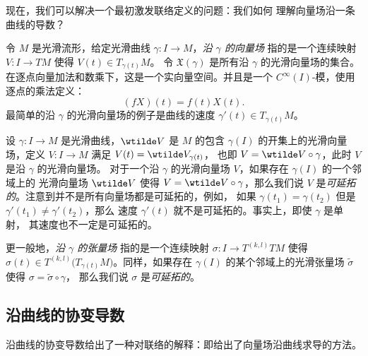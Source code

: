 \documentclass[fontset=none]{Notes}
\begin{document}
现在，我们可以解决一个最初激发联络定义的问题：我们如何
理解向量场沿一条曲线的导数？

令 $M$ 是光滑流形，给定光滑曲线 $\gamma:I\to M$，\emph{沿 $\gamma$ 的向量场}
指的是一个连续映射 $V:I\to TM$ 使得 $V(t)\in T_{\gamma(t)}M$。
令 $\mathfrak{X}(\gamma)$ 是所有沿 $\gamma$ 的光滑向量场的集合。
在逐点向量加法和数乘下，这是一个实向量空间。并且是一个
$C^\infty(I)$-模，使用逐点的乘法定义：
\[
  (fX)(t)=f(t)X(t).  
\]
最简单的沿 $\gamma$ 的光滑向量场的例子是曲线的速度
$\gamma'(t)\in T_{\gamma(t)}M$。

设 $\gamma:I\to M$ 是光滑曲线，$\wtilde V$ 是 $M$ 的包含 $\gamma(I)$
的开集上的光滑向量场，定义 $V:I\to M$ 满足 $V(t)= \wtilde V_{\gamma(t)}$，
也即 $V=\wtilde V\circ \gamma$，此时 $V$ 是沿 $\gamma$ 的光滑向量场。
对于一个沿 $\gamma$ 的光滑向量场 $V$，如果存在 $\gamma(I)$ 的一个邻域上的
光滑向量场 $\wtilde V$ 使得 $V=\wtilde V\circ\gamma$，那么我们说
$V$ 是\emph{可延拓的}。注意到并不是所有向量场都是可延拓的，例如，
如果 $\gamma(t_1)=\gamma(t_2)$ 但是 $\gamma'(t_1)\neq \gamma'(t_2)$，那么
速度 $\gamma'(t)$ 就不是可延拓的。事实上，即使 $\gamma$ 是单射，
其速度也不一定是可延拓的。

更一般地，\emph{沿 $\gamma$ 的张量场} 指的是一个连续映射 $\sigma:I\to T^{(k,l)}TM$
使得 $\sigma(t)\in T^{(k,l)}\bigl(T_{\gamma(t)}M\bigr)$。同样，如果存在
$\gamma(I)$ 的某个邻域上的光滑张量场 $\tilde\sigma$ 使得 $\sigma=\tilde\sigma\circ\gamma$，
那么我们说 $\sigma$ 是\emph{可延拓的}。

\subsection{沿曲线的协变导数}

沿曲线的协变导数给出了一种对联络的解释：即给出了向量场沿曲线求导的方法。
\end{document}
